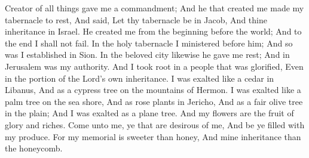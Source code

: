  Creator of all things gave me a commandment; And he that created me made my tabernacle to rest, And said, Let thy tabernacle be in Jacob, And thine inheritance in Israel. He created me from the beginning before the world; And to the end I shall not fail. In the holy tabernacle I ministered before him; And so was I established in Sion. In the beloved city likewise he gave me rest; And in Jerusalem was my authority.  And I took root in a people that was glorified, Even in the portion of the Lord's own inheritance. I was exalted like a cedar in Libanus, And as a cypress tree on the mountains of Hermon. I was exalted like a palm tree on the sea shore, And as rose plants in Jericho, And as a fair olive tree in the plain; And I was exalted as a plane tree. And my flowers are the fruit of glory and riches. Come unto me, ye that are desirous of me, And be ye filled with my produce. For my memorial is sweeter than honey, And mine inheritance than the honeycomb.



